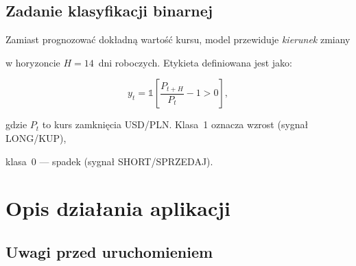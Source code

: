 \documentclass[12pt,a4paper]{report}
\begin{document}
\section{Zadanie klasyfikacji binarnej}



Zamiast prognozować dokładną wartość kursu, model przewiduje \emph{kierunek} zmiany

w horyzoncie $H = 14$~dni roboczych. Etykieta definiowana jest jako:

\begin{equation}

    y_t = \mathbb{1}\!\left[\frac{P_{t+H}}{P_t} - 1 > 0\right],

    \label{eq:target-doc}

\end{equation}

gdzie $P_t$ to kurs zamknięcia USD/PLN. Klasa~1 oznacza wzrost (sygnał LONG/KUP),

klasa~0 --- spadek (sygnał SHORT/SPRZEDAJ).




\chapter{Opis działania aplikacji}




\section{Uwagi przed uruchomieniem}
\end{document}
